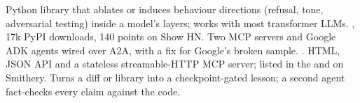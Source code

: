 
\begin{cventries}
\begin{linelist}
    {Python library that ablates or induces behaviour directions (refusal, tone, adversarial testing) inside a model's layers; works with most transformer LLMs. , 17k PyPI downloads, 140 points on Show HN.}
    {Two MCP servers and Google ADK agents wired over A2A, with a fix for Google's broken sample. .}
    {HTML, JSON API and a stateless streamable-HTTP MCP server; listed in the  and on Smithery.}
    {Turns a diff or library into a checkpoint-gated lesson; a second agent fact-checks every claim against the code.}
\end{linelist}
\end{cventries}
